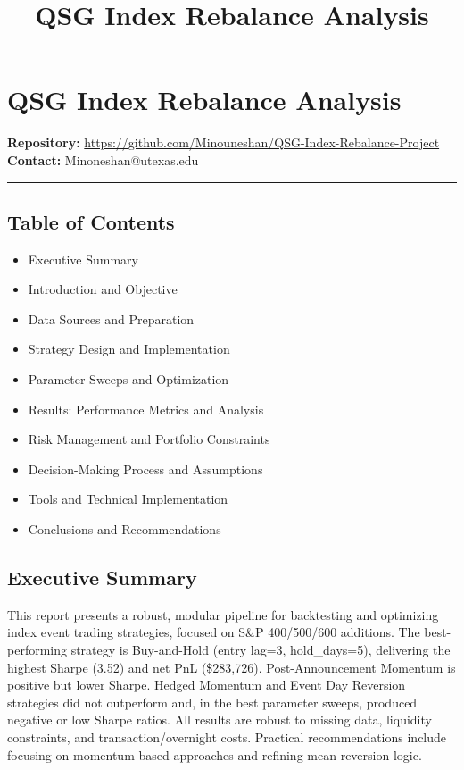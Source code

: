 \documentclass[11pt]{article}
\title{QSG Index Rebalance Analysis}
\begin{document}
    \maketitle

    \section*{QSG Index Rebalance Analysis}

\textbf{Repository:}
\url{https://github.com/Minouneshan/QSG-Index-Rebalance-Project}\\
\textbf{Contact:} Minoneshan@utexas.edu

\begin{center}\rule{0.5\linewidth}{0.5pt}\end{center}

    \subsection*{Table of Contents}
\begin{itemize}
  \item Executive Summary
  \item Introduction and Objective
  \item Data Sources and Preparation
  \item Strategy Design and Implementation
  \item Parameter Sweeps and Optimization
  \item Results: Performance Metrics and Analysis
  \item Risk Management and Portfolio Constraints
  \item Decision-Making Process and Assumptions
  \item Tools and Technical Implementation
  \item Conclusions and Recommendations
\end{itemize}

    \subsection*{Executive Summary}

This report presents a robust, modular pipeline for backtesting and
optimizing index event trading strategies, focused on S\&P 400/500/600
additions. The best-performing strategy is Buy-and-Hold (entry lag=3,
hold\_days=5), delivering the highest Sharpe (3.52) and net PnL
(\$283,726). Post-Announcement Momentum is positive but lower Sharpe.
Hedged Momentum and Event Day Reversion strategies did not outperform
and, in the best parameter sweeps, produced negative or low Sharpe
ratios. All results are robust to missing data, liquidity constraints,
and transaction/overnight costs. Practical recommendations include
focusing on momentum-based approaches and refining mean reversion logic.
\end{document}
